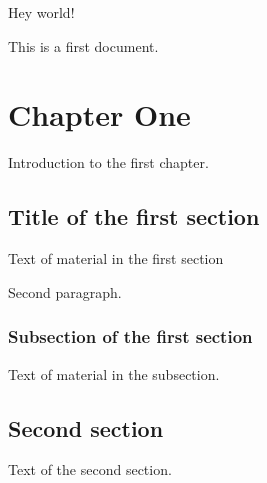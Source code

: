 \documentclass{book}
\begin{document}
Hey world!

This is a first document.

\chapter{Chapter One}
Introduction to the first chapter.

\section{Title of the first section}
Text of material in the first section

Second paragraph.

\subsection{Subsection of the first section}

Text of material in the subsection.

\section{Second section}

Text of the second section.
\end{document}
